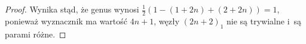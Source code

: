 \begin{proof}
\begin{comment}
            \draw[semithick] (0,-10) circle (3);

            \draw[semithick] (-30, 15) to [out=left, in=up]   (-45, 0);
            \draw[semithick] (-30,-15) to [out=left, in=down] (-45, 0);
            \draw[semithick] (-30,  5) to [out=left, in=up]   (-35, 0);
            \draw[semithick] (-30, -5) to [out=left, in=down] (-35, 0);

            \draw[semithick] (30, 15) to [out=right, in=up]   (45,0);
            \draw[semithick] (30,-15) to [out=right, in=down] (45,0);
            \draw[semithick] (30,  5) to [out=right, in=up]   (35,0);
            \draw[semithick] (30, -5) to [out=right, in=down] (35,0);

            \draw[semithick] (-30, 15) to [out=right, in=up] (-20,10);
            \draw[semithick] (-30,  5) to [out=right, in=down] (-20,10);

            \draw[semithick] (30, 15) to [out=left, in=up] (20,10);
            \draw[semithick] (30,  5) to [out=left, in=down] (20,10);

            \draw[semithick] (-10, 10) circle (5);
            \draw[semithick] (10,  10) circle (5);
        \end{tikzpicture}
    \]
\end{comment}
    Wynika stąd, że genus wynosi $\frac 12 (1 - (1+2n) + (2+2n)) = 1$, ponieważ wyznacznik ma wartość $4n+1$,
    węzły $(2n+2)_1$ nie są trywialne i~są parami różne.
\end{proof}



